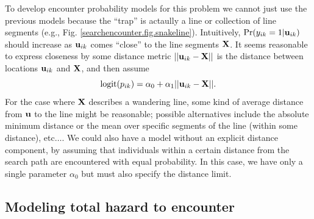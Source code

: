 To develop encounter probability models for this problem we cannot
just use the previous models because the ``trap'' is actaully a line
or collection of line segments (e.g.,
Fig. \ref{searchencounter.fig.snakeline}).  Intuitively,
$\Pr(y_{ik}=1|{\bf u}_{ik})$ should increase as ${\bf u}_{ik}$ comes
``close'' to the line segments ${\bf X}$. It seems reasonable to
express closeness by some distance metric $||{\bf u}_{ik} - {\bf X}
||$ is the distance between locations ${\bf u}_{ik}$ and ${\bf X}$,
and then assume
\[
\mbox{logit}(p_{ik}) = \alpha_{0} + \alpha_{1} ||{\bf u}_{ik} - {\bf X}||.
\]
For the case where ${\bf X}$ describes a wandering line, some kind of
average distance from ${\bf u}$ to the line might be reasonable;
possible alternatives include the absolute minimum distance or the
mean over specific segments of the line (within some distance),
etc$\dots$.  We could also have a model without an explicit distance
component, by assuming that individuals within a certain distance from
the search path are encountered with equal probability. In this case,
we have only a single parameter $\alpha_{0}$ but must also specify the
distance limit.


\subsection{Modeling total hazard to encounter}


